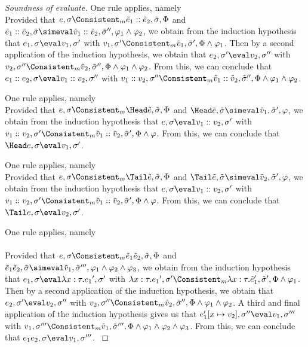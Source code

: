 \begin{proof}[Soundness of evaluate]
    {One rule applies, namely \\
    Provided that $e,\sigma\Consistent_m\tilde{e}_1::\tilde{e}_2,\tilde{\sigma},\Phi$ and $\tilde{e}_1::\tilde{e}_2,\tilde{\sigma}\simeval\tilde{v}_1::\tilde{v}_2,\tilde{\sigma}'',\phi_1\land\phi_2$,
    we obtain from the induction hypothesis that $e_1,\sigma\eval v_1,\sigma'$ with $v_1,\sigma'\Consistent_m\tilde{v}_1,\tilde{\sigma}',\Phi\land\phi_1$.
    Then by a second application of the induction hypothesis, we obtain that $e_2,\sigma'\eval v_2,\sigma''$ with $v_2,\sigma''\Consistent_m\tilde{v}_2,\tilde{\sigma}'',\Phi\land\phi_1\land\phi_2$.
    From this, we can conclude that $e_1 :: e_2,\sigma\eval v_1 :: v_2,\sigma''$ with $v_1 :: v_2,\sigma''\Consistent_m\tilde{v}_1 :: \tilde{v}_2,\tilde{\sigma}'',\Phi\land\phi_1\land\phi_2$.
   }

    {One rule applies, namely \\
    Provided that $e,\sigma\Consistent_m\Head \tilde{e},\tilde{\sigma},\Phi$ and $\Head \tilde{e},\tilde{\sigma}\simeval\tilde{v}_1,\tilde{\sigma}',\phi$,
    we obtain from the induction hypothesis that $e,\sigma\eval v_1::v_2,\sigma'$ with $v_1::v_2,\sigma'\Consistent_m\tilde{v}_1::\tilde{v}_2,\tilde{\sigma}',\Phi\land\phi$.
    From this, we can conclude that $\Head e,\sigma\eval v_1,\sigma'$.
    }

    {One rule applies, namely \\
    Provided that $e,\sigma\Consistent_m\Tail \tilde{e},\tilde{\sigma},\Phi$ and $\Tail \tilde{e},\tilde{\sigma}\simeval\tilde{v}_2,\tilde{\sigma}',\phi$,
    we obtain from the induction hypothesis that $e,\sigma\eval v_1::v_2,\sigma'$ with $v_1::v_2,\sigma'\Consistent_m\tilde{v}_1::\tilde{v}_2,\tilde{\sigma}',\Phi\land\phi$.
    From this, we can conclude that $\Tail e,\sigma\eval v_2,\sigma'$.
      }

    {One rule applies, namely\\ \\

    Provided that $e,\sigma\Consistent_m\tilde{e}_1 \tilde{e}_2,\tilde{\sigma},\Phi$ and $\tilde{e}_1 \tilde{e}_2,\tilde{\sigma}\simeval\tilde{v}_1,\tilde{\sigma}''',\phi_1\land\phi_2\land\phi_3$,
    we obtain from the induction hypothesis that $e_1,\sigma\eval \lambda x:\tau.{e_1}',\sigma'$ with $\lambda x:\tau.{e_1}',\sigma'\Consistent_m\lambda x:\tau.\tilde{e}_1',\tilde{\sigma}',\Phi\land\phi_1$.
    Then by a second application of the induction hypothesis, we obtain that $e_2,\sigma'\eval v_2,\sigma''$ with $v_2,\sigma''\Consistent_m\tilde{v}_2,\tilde{\sigma}'',\Phi\land\phi_1\land\phi_2$.
    A third and final application of the induction hypothesis gives us that $e_1'[x\mapsto v_2],\sigma'' \eval v_1,\sigma'''$ with
    $v_1,\sigma'''\Consistent_m\tilde{v}_1,\tilde{\sigma}''',\Phi\land\phi_1\land\phi_2\land\phi_3$.
    From this, we can conclude that $e_1 e_2,\sigma\eval v_1,\sigma'''$.
    }


\end{proof}

